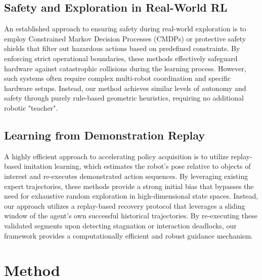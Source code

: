 \documentclass[runningheads]{llncs}
\begin{document}
\subsection{Safety and Exploration in Real-World RL}
An established approach to ensuring safety during real-world exploration is to employ Constrained Markov Decision Processes (CMDPs) or protective safety shields that filter out hazardous actions based on predefined constraints\cite{hu2025robottrainsrobotautomatic, thananjeyan2021recoveryrlsafereinforcement,li2020robustmodelpredictiveshielding,6225136, alshiekh2017safereinforcementlearningshielding, fisac2018generalsafetyframeworklearningbased}. By enforcing strict operational boundaries, these methods effectively safeguard hardware against catastrophic collisions during the learning process. However, such systems often require complex multi-robot coordination and specific hardware setups. Instead, our method achieves similar levels of autonomy and safety through purely rule-based geometric heuristics, requiring no additional robotic "teacher". 

\subsection{Learning from Demonstration Replay}
A highly efficient approach to accelerating policy acquisition is to utilize replay-based imitation learning, which estimates the robot’s pose relative to objects of interest and re-executes demonstrated action sequences\cite{johns2021coarsetofineimitationlearningrobot, valassakis2022demonstrateonceimitateimmediately,dipalo2023effectivenessretrievalalignmentreplay,wen2022demonstrateoncecategorylevelmanipulation}. By leveraging existing expert trajectories, these methods provide a strong initial bias that bypasses the need for exhaustive random exploration in high-dimensional state spaces.
Instead, our approach utilizes a replay-based recovery protocol that leverages a sliding window of the agent's own successful historical trajectories. By re-executing these validated segments upon detecting stagnation or interaction deadlocks, our framework provides a computationally efficient and robust guidance mechanism.

\section{Method}
\end{document}
